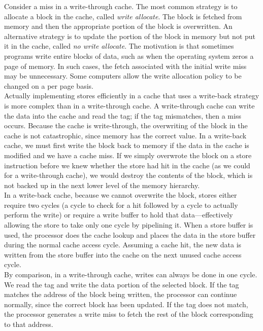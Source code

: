 \documentclass[12pt]{article}
\theoremstyle{definition}
\begin{document}
  Consider a miss in a write-through cache.
  The most common strategy is to allocate a block in the cache, called \emph{write allocate}.
  The block is fetched from memory and then the appropriate portion of the block is overwritten.
  An alternative strategy is to update the portion of the block in memory but not put it in the cache, called \emph{no write allocate}.
  The motivation is that sometimes programs write entire blocks of data, such as when the operating system zeros a page of memory.
  In such cases, the fetch associated with the initial write miss may be unnecessary.
  Some computers allow the write allocation policy to be changed on a per page basis. \\

  Actually implementing stores efficiently in a cache that uses a write-back strategy is more complex than in a write-through cache.
  A write-through cache can write the data into the cache and read the tag;
  if the tag mismatches, then a miss occurs.
  Because the cache is write-through, the overwriting of the block in the cache is not catastrophic, since memory has the correct value.
  In a write-back cache, we must first write the block back to memory if the data in the cache is modified and we have a cache miss.
  If we simply overwrote the block on a store instruction before we knew whether the store had hit in the cache (as we could for a write-through cache), we would destroy the contents of the block, which is not backed up in the next lower level of the memory hierarchy. \\

  In a write-back cache, because we cannot overwrite the block, stores either require two cycles (a cycle to check for a hit followed by a cycle to actually perform the write) or require a write buffer to hold that data---effectively allowing the store to take only one cycle by pipelining it.
  When a store buffer is used, the processor does the cache lookup and places the data in the store buffer during the normal cache access cycle.
  Assuming a cache hit, the new data is written from the store buffer into the cache on the next unused cache access cycle. \\

  By comparison, in a write-through cache, writes can always be done in one cycle.
  We read the tag and write the data portion of the selected block.
  If the tag matches the address of the block being written, the processor can continue normally, since the correct block has been updated.
  If the tag does not match, the processor generates a write miss to fetch the rest of the block corresponding to that address. \\
\end{document}
